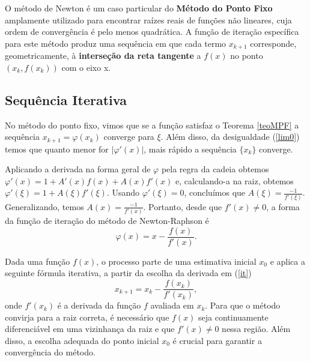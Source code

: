 


O método de Newton é um caso particular do \textbf{Método do Ponto Fixo} amplamente utilizado para encontrar raízes %
reais de funções não lineares, cuja ordem de convergência é pelo menos quadrática. A função de iteração específica para este método produz uma sequência em que cada termo $x_{k+1}$ corresponde, geometricamente, à \textbf{interseção da reta tangente} a $f(x)$ no ponto $(x_k, f(x_k))$ com o eixo x. 

\subsection{Sequência Iterativa} 
No método do ponto fixo, vimos que se a função satisfaz o Teorema \ref{teoMPF} a sequência $x_{k+1} = \varphi(x_k)$ converge para $\xi$. Além disso, da desigualdade (\ref{lim0}) temos que quanto menor for $|\varphi'(x)|$, mais rápido a sequência $\{x_k\}$ converge.

Aplicando a derivada na forma geral de $\varphi$ pela regra da cadeia obtemos $\varphi'(x) = 1 + A'(x)f(x) + A(x)f'(x)$ e, calculando-a na raiz, obtemos $\varphi'(\xi) = 1 + A(\xi)f'(\xi)$. Usando $\varphi'(\xi) = 0$, concluímos que $A(\xi) = \frac{-1}{f'(\xi)}$. Generalizando, temos $A(x) = \frac{-1}{f'(x)}$. Portanto, desde que $f'(x) \neq 0$, a forma da função de iteração do método de Newton-Raphson é 
\begin{equation} \label{phiNR1d}
    \varphi(x) = x - \frac{f(x)}{f'(x)}.
\end{equation}

Dada uma função \(f(x)\), o processo parte de uma estimativa inicial \(x_0\) e aplica a seguinte fórmula iterativa, a partir da escolha da derivada em (\ref{it})
\begin{equation} \label{nr}
    x_{k+1} = x_k - \frac{f(x_k)}{f'(x_k)},
\end{equation}
onde \(f'(x_k)\) é a derivada da função \(f\) avaliada em \(x_k\).
Para que o método convirja para a raiz correta, é necessário que \(f(x)\) seja continuamente diferenciável em uma vizinhança da raiz e que \(f'(x) \neq 0\) nessa região. Além disso, a escolha adequada do ponto inicial \(x_0\) é crucial para garantir a convergência do método.

